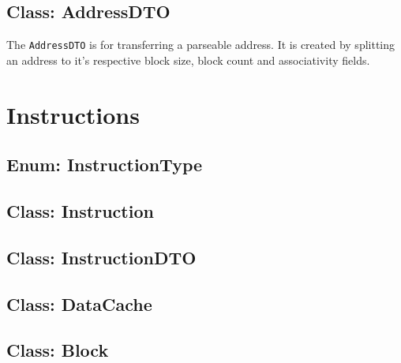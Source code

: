 \documentclass[a4paper]{scrreprt}
\begin{document}


\subsection{Class: AddressDTO}
\label{subsec:addressdto.java}

The \texttt{AddressDTO} is for transferring a parseable address. It is created by splitting an address to it's respective block size, block count and associativity fields.



\section{Instructions}

\subsection{Enum: InstructionType}
\label{subsec:instructiontype.java}


\subsection{Class: Instruction}
\label{subsec:instruction.java}


\subsection{Class: InstructionDTO}
\label{subsec:instructiondto.java}


\subsection{Class: DataCache}
\label{subsec:datacache.java}


\subsection{Class: Block}
\label{subsec:block.java}

\end{document}
